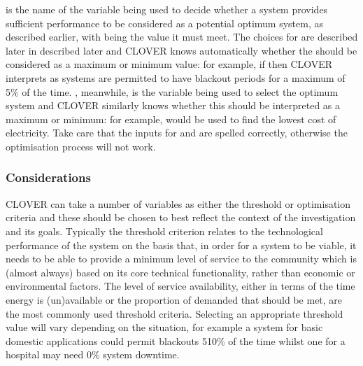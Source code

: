 \documentclass[letterpaper,10pt,english]{sphinxmanual}
\begin{document}
\sphinxAtStartPar
{} is the name of the variable being used to decide
whether a system provides sufficient performance to be considered as a
potential optimum system, as described earlier, with 
being the value it must meet. The choices for 
are described later in described later and
CLOVER knows automatically whether the  should be
considered as a maximum or minimum value: for example, if
 then CLOVER interprets
 as systems are permitted to have blackout
periods for a maximum of 5\% of the time. ,
meanwhile, is the variable being used to select the optimum system and
CLOVER similarly knows whether this should be interpreted as a maximum
or minimum: for example,  would
be used to find the lowest cost of electricity. Take care that the
inputs for  and  are
spelled correctly, otherwise the optimisation process will not work.


\subsubsection{Considerations}
\label{\detokenize{optimisation:considerations}}
\sphinxAtStartPar
CLOVER can take a number of variables as either the threshold or
optimisation criteria and these should be chosen to best reflect the
context of the investigation and its goals. Typically the threshold
criterion relates to the technological performance of the system on the
basis that, in order for a system to be viable, it needs to be able to
provide a minimum level of service to the community which is (almost
always) based on its core technical functionality, rather than economic
or environmental factors. The level of service availability, either in
terms of the time energy is (un)available or the proportion of demanded
that should be met, are the most commonly used threshold criteria.
Selecting an appropriate threshold value will vary depending on the
situation, for example a system for basic domestic applications could
permit blackouts 5\sphinxhyphen{}10\% of the time whilst one for a hospital may need 0\%
system downtime.
\end{document}
